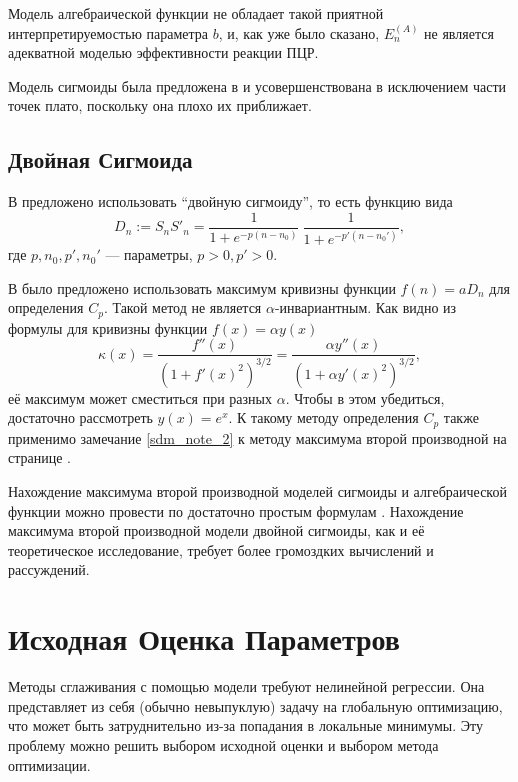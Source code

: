 Модель алгебраической функции не обладает такой приятной интерпретируемостью
параметра $b$, и, как уже было сказано, $E^{(A)}_{n}$ не является адекватной
моделью эффективности реакции ПЦР.

Модель сигмоиды была предложена в \cite{liuValidationQuantitativeMethod2002} и
усовершенствована в \cite{rutledgeSigmoidalCurvefittingRedefines2004}
исключением части точек плато, поскольку она плохо их приближает.

\subsection{Двойная Сигмоида}

В
\cite{kurnikPCRElbowDetermination2007,kurnikPCRElbowDetermination2011}
предложено использовать ``двойную сигмоиду'', то есть функцию вида
\[
  D_{n}:=S_{n}S'_{n}=\frac{1}{1+e^{-p(n-n_0)}}~
  \frac{1}{1+e^{-p'(n-n_0')}},
\]
где $p,n_0,p',n_0'$ --- параметры, $p>0,p'>0$.

В \cite{kurnikPCRElbowDetermination2011} было предложено использовать
максимум кривизны функции $f(n)=aD_{n}$ для определения $C_{p}$.
Такой метод не является $\alpha$\hyp{}инвариантным. Как видно из формулы для
кривизны функции $f(x)=\alpha y(x)$
\[
  \kappa(x)=\frac{f''(x)}{(1+f'(x)^{2})^{3/2}}=
  \frac{\alpha y''(x)}{(1+\alpha y'(x)^{2})^{3/2}},
\]
её максимум может сместиться при разных $\alpha$. Чтобы в этом убедиться,
достаточно рассмотреть $y(x)=e^{x}$. К такому методу определения $C_{p}$ также
применимо замечание \ref{sdm_note_2} к методу максимума второй производной
на странице \pageref{sdm_note_2}.

Нахождение максимума второй производной моделей сигмоиды и алгебраической
функции можно провести по достаточно простым формулам
\cite{zhaoComprehensiveAlgorithmQuantitative2005}. Нахождение максимума второй
производной модели двойной сигмоиды, как и её теоретическое исследование,
требует более громоздких вычислений и рассуждений.

\section{Исходная Оценка Параметров}\label{sec:initial}

Методы сглаживания с помощью модели требуют нелинейной регрессии. Она
представляет из себя (обычно невыпуклую) задачу на глобальную оптимизацию, что
может быть затруднительно из-за попадания в локальные минимумы. Эту проблему
можно решить выбором исходной оценки и выбором метода оптимизации.

